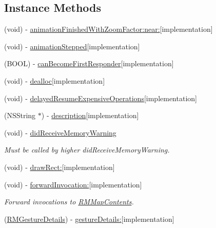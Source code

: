 \subsection*{Instance Methods}
\begin{DoxyCompactItemize}
\item 
(void) -\/ \hyperlink{interface_r_m_map_view_ab512cbaf772a0c0b6a8a8fb10f80d2b4}{animation\-Finished\-With\-Zoom\-Factor\-:near\-:}{\ttfamily  \mbox{[}implementation\mbox{]}}
\item 
(void) -\/ \hyperlink{interface_r_m_map_view_a795716de54229787251beb8957477905}{animation\-Stepped}{\ttfamily  \mbox{[}implementation\mbox{]}}
\item 
(B\-O\-O\-L) -\/ \hyperlink{interface_r_m_map_view_a71183d1cfbc01ab7fa3c60890165e195}{can\-Become\-First\-Responder}{\ttfamily  \mbox{[}implementation\mbox{]}}
\item 
(void) -\/ \hyperlink{interface_r_m_map_view_a617a8a88530a946d5eb3a1f759286e8b}{dealloc}{\ttfamily  \mbox{[}implementation\mbox{]}}
\item 
(void) -\/ \hyperlink{interface_r_m_map_view_a3c77bbe947d54f2204c507964958d00c}{delayed\-Resume\-Expensive\-Operations}{\ttfamily  \mbox{[}implementation\mbox{]}}
\item 
(N\-S\-String $\ast$) -\/ \hyperlink{interface_r_m_map_view_aa23a642a33fd21939aee40ba44e20a6f}{description}{\ttfamily  \mbox{[}implementation\mbox{]}}
\item 
(void) -\/ \hyperlink{interface_r_m_map_view_ae58c168c733c803c56654428f0c8f3f8}{did\-Receive\-Memory\-Warning}
\begin{DoxyCompactList}\small\item\em Must be called by higher did\-Receive\-Memory\-Warning. \end{DoxyCompactList}\item 
(void) -\/ \hyperlink{interface_r_m_map_view_a7f702df1576c7b8db4b2173c6902700c}{draw\-Rect\-:}{\ttfamily  \mbox{[}implementation\mbox{]}}
\item 
(void) -\/ \hyperlink{interface_r_m_map_view_af7d6b307e05ec8764af12246115b96f8}{forward\-Invocation\-:}{\ttfamily  \mbox{[}implementation\mbox{]}}
\begin{DoxyCompactList}\small\item\em Forward invocations to \hyperlink{interface_r_m_map_contents}{R\-M\-Map\-Contents}. \end{DoxyCompactList}\item 
(\hyperlink{struct_r_m_gesture_details}{R\-M\-Gesture\-Details}) -\/ \hyperlink{interface_r_m_map_view_abb2649a394b8b7289abeec07085fcf57}{gesture\-Details\-:}{\ttfamily  \mbox{[}implementation\mbox{]}}

\end{DoxyCompactItemize}
